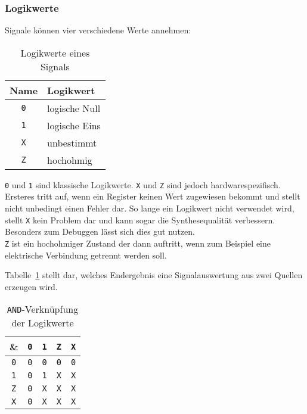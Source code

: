 \subsubsection*{Logikwerte}
Signale können vier verschiedene Werte annehmen:
\begin{table}[H]
	\begin{center}
		\begin{tabularx}{0.3\textwidth}{cl}
			\toprule
			\textbf{Name} & \textbf{Logikwert}\\
			\midrule
			\texttt{0} & logische Null\\
			\texttt{1} & logische Eins\\
			\texttt{X} & unbestimmt\\
			\texttt{Z} & hochohmig\\
			\bottomrule
		\end{tabularx}
		\caption{Logikwerte eines Signals}
	\end{center}
\end{table}
\texttt{0} und \texttt{1} sind klassische Logikwerte. \texttt{X} und \texttt{Z} sind jedoch hardwarespezifisch. Ersteres tritt auf, wenn ein Register keinen Wert zugewiesen bekommt und stellt nicht unbedingt einen Fehler dar. So lange ein Logikwert nicht verwendet wird, stellt \texttt{X} kein Problem dar und kann sogar die Synthesequalität verbessern. Besonders zum Debuggen lässt sich dies gut nutzen.\\
\texttt{Z} ist ein hochohmiger Zustand der dann auftritt, wenn zum Beispiel eine elektrische Verbindung getrennt werden soll.

Tabelle~\ref{tab:resolve} stellt dar, welches Endergebnis eine
Signalauswertung aus zwei Quellen erzeugen wird.
\begin{table}[h]
	\begin{center}
		\begin{tabularx}{0.2\textwidth}{ccccc}
			\toprule
			\textbf{\&}&\texttt{0}&\texttt{1}&\texttt{Z}&\texttt{X} \\
			\midrule
			\texttt{0}&\texttt{0}&\texttt{0}&\texttt{0}&\texttt{0}\\
			\texttt{1}&\texttt{0}&\texttt{1}&\texttt{X}&\texttt{X}\\
			\texttt{Z}&\texttt{0}&\texttt{X}&\texttt{X}&\texttt{X}\\
			\texttt{X}&\texttt{0}&\texttt{X}&\texttt{X}&\texttt{X}\\
			\bottomrule
		\end{tabularx}
		\caption{\texttt{AND}-Verknüpfung der Logikwerte}\label{tab:resolve}
	\end{center}
\end{table}

